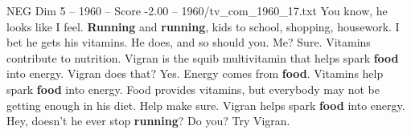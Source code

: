 \begin{textsample}{NEG Dim 5 – 1960 – Score -2.00 – 1960/tv\_com\_1960\_17.txt}  \label{ex:f5_neg_020}
You know, he looks like I feel. \textbf{Running} and \textbf{running}, kids to school, shopping, housework.
I bet he gets his vitamins.
He does, and so should you.
Me?
Sure.
Vitamins contribute to nutrition.
Vigran is the squib multivitamin that helps spark \textbf{food} into energy.
Vigran does that?
Yes.
Energy comes from \textbf{food}.
Vitamins help spark \textbf{food} into energy.
Food provides vitamins, but everybody may not be getting enough in his diet.
Help make sure.
Vigran helps spark \textbf{food} into energy.
Hey, doesn't he ever stop \textbf{running}?
Do you?
Try Vigran.

\end{textsample}
